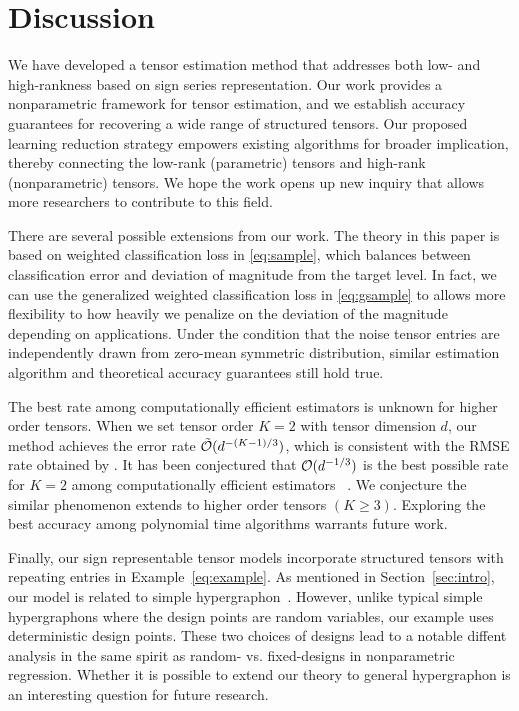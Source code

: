 \documentclass[twoside,11pt]{article}
\theoremstyle{plain}
\theoremstyle{definition}
\begin{document}
\section{Discussion}\label{sec:conclusion}
We have developed a tensor estimation method that addresses both low- and high-rankness based on
sign series representation. Our work provides a nonparametric framework for tensor estimation, and
we establish accuracy guarantees for recovering a wide range of structured tensors. Our proposed
learning reduction strategy empowers existing algorithms for broader implication, thereby connecting
the low-rank (parametric) tensors and high-rank (nonparametric) tensors. We hope the work opens up
new inquiry that allows more researchers to contribute to this field.


There are several possible extensions from our work. The theory in this paper is based on weighted classification loss in \eqref{eq:sample}, which balances between classification error and deviation of magnitude from the target level. In fact, we can use the generalized weighted classification loss in  \eqref{eq:gsample} to allows more flexibility to how heavily we penalize on the deviation of the magnitude depending on applications.  Under the condition that the noise tensor entries are independently drawn from zero-mean symmetric distribution, similar estimation algorithm and theoretical accuracy guarantees still hold true. 


The best rate among computationally efficient estimators is unknown for higher order tensors. When we set tensor order $K = 2$ with tensor dimension $d$, our method achieves the error rate $\tilde{\mathcal{O}}(d^{-(K-1)/3})$, which is consistent with the RMSE rate obtained by \cite{xu2018rates}. It has been conjectured that $\mathcal{O}(d^{-1/3})$ is the best possible rate for $K = 2$ among computationally efficient estimators ~\citep{xu2018rates,zhang2018network}. We conjecture the similar phenomenon extends to higher order tensors $(K\geq 3)$. Exploring the best accuracy among polynomial time algorithms warrants future work.


Finally, our sign representable tensor models incorporate structured tensors with repeating entries in Example~\ref{eq:example}. As mentioned in Section~\ref{sec:intro}, our model is related to simple hypergraphon~\citep{balasubramanian2021nonparametric}. However, unlike typical simple hypergraphons where the design points are random variables, our example uses deterministic design points. These two choices of designs lead to a notable diffent analysis in the same spirit as random- vs. fixed-designs in nonparametric regression. Whether it is possible to extend our theory to general hypergraphon is an interesting question for future research.
\end{document}
